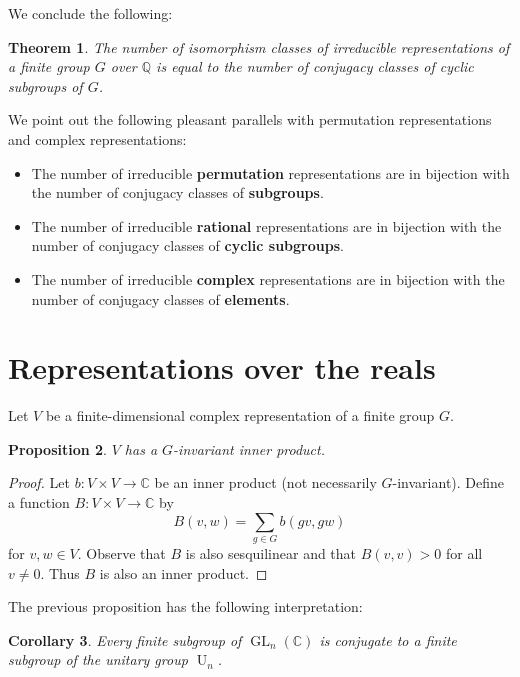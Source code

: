 \documentclass[12pt]{article}
\theoremstyle{plain}
\newtheorem{theorem}{Theorem}[section]
\newtheorem{proposition}[theorem]{Proposition}
\newtheorem{corollary}[theorem]{Corollary}
\theoremstyle{definition}
\theoremstyle{remark}
\numberwithin{equation}{section}
\begin{document}
We conclude the following:

\begin{theorem}
The number of isomorphism classes of irreducible representations of a
finite group $G$ over $\mathbb{Q}$ is equal to the number of conjugacy
classes of cyclic subgroups of $G$.
\end{theorem}

We point out the following pleasant parallels with permutation
representations and complex representations:

\begin{itemize}
\item The number of irreducible \textbf{permutation} representations are in
bijection with the number of conjugacy classes of \textbf{subgroups}.
\item The number of irreducible \textbf{rational} representations are in
bijection with the number of conjugacy classes of \textbf{cyclic
subgroups}.
\item The number of irreducible \textbf{complex} representations are in
bijection with the number of conjugacy classes of \textbf{elements}.
\end{itemize}

\section{Representations over the reals}

Let $V$ be a finite-dimensional
complex representation of a finite group $G$.

\begin{proposition}
$V$ has a $G$-invariant inner product.
\end{proposition}

\begin{proof}
Let $b : V \times V \to \mathbb{C}$ be an inner product (not necessarily
$G$-invariant).
Define a function $B : V \times V \to \mathbb{C}$ by
\[
B(v,w) = \sum_{g \in G}b(gv,gw)
\]
for $v, w \in V$.
Observe that $B$ is also sesquilinear
and that $B(v,v) > 0$ for all $v \ne 0$.
Thus $B$ is also an inner product.
\end{proof}

The previous proposition has the following interpretation:

\begin{corollary}
Every finite subgroup of $\operatorname{GL}_n(\mathbb{C})$
is conjugate to a finite subgroup of the unitary group $\operatorname{U}_n$.
\end{corollary}
\end{document}
